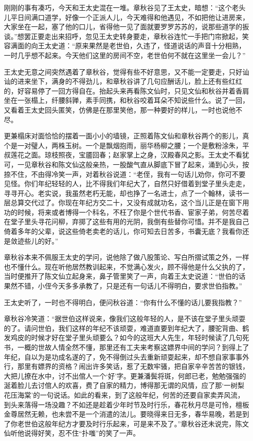 \documentclass[12pt,UTF8]{ctexbook}
\begin{document}
{{{刚刚的事有凑巧，今天和王太史混在一堆。章秋谷见了王太史，暗想：“这个老头儿平日间满口道学，好像一个正派人儿，今天难得和他遇见，不如把他让进房来，大家坐在一起，塞了他的口儿，省得他一见了面就要罗罗苏苏的，说那些道学的扳谈。”想罢正要走出来招呼，忽见王太史转身要走，章秋谷连忙一手把门帘掀起，笑容满面的向王太史道：“原来果然是老世伯，久违了，怪道说话的声音十分相熟，一时几乎想不起来。今天他们这里的房间不空，老世伯何不就在这里坐一会儿？”

王太史无意之间突然遇着了章秋谷，觉得有些不好意思，又不能一定要走，只好讪讪的进来坐下，满身的不得劲儿，和章秋谷讲了几句应酬话儿，脸上还有些红红的，好容易停了一回方得自在。抬起头来再看陈文仙时，只见文仙和秋谷并着香肩坐在一张榻上，纤腰斜亸，素手同携，和秋谷咬着耳朵不知说些什么。说了一回，又看着王太史回头匿笑，仿佛是在那里笑他，那一种要好的样儿，一时也说他不尽。

更兼榻床对面恰恰的摆着一面小小的墙镜，正照着陈文仙和章秋谷两个的影儿，真个是一对璧人，两株玉树。一个是飘烟抱雨，丽华杨柳之腰；一个是敷粉涂朱，平叔莲花之面。琼枝照夜，宝靥回春；赵家掌上之身，汉殿春风之影。王太史不看犹可，一见章秋谷和陈文仙这般亲热，一股酸气直从脚底下冒了起来，涌到心头，按捺不住，不由得冷笑一声，对着秋谷说道：“老侄，我有一句话儿劝你，你可不要见怪。你们年纪轻轻的人，比不得我们年纪大了，自然只好借着到堂子里头走走，寻寻开心。老实说，我虽然老朽无能，却也挣了一名进士，点了一个翰林，读书一层总算交代过了。你现在年纪方交二十，又没有成就功名，这个当儿正是在窗下用功的时候，将来或者博得一个科名，不枉了你是个世代书香、宦家子弟，何苦尽着在堂子里头寻花问柳，弃掷了这些有用的光阴，我倒有些替你可惜。并不是我自己倚着多年的父辈，说这些倚老卖老的话儿，你可知去日苦多，书囊无底？我看你还是敛迹些儿的好。”

章秋谷本来不佩服王太史的学问，说他除了做八股策论、写白所摺试策之外，一样也不懂什么。现在听他居然教训起来，不觉满心发火，顾不得他是什么父执的了，当时便推开了陈文仙立起身来，鼻子管里笑了一声，向着王太史说道：“世伯的话果然不错，小侄今天多多承教了，只是还有一句话儿不得明白，要求世伯指教。”

王太史听了，一时也不得明白，便问秋谷道：“你有什么不懂的话儿要我指教？”

章秋谷冷笑道：“据世伯这样说来，像我们这般年轻的人，是不该在堂子里头顽耍的了。请问世伯，我们这样的年纪不该顽耍，难道直要到年纪大了，腰驼背曲、鹤发鸡皮的时候才好在堂子里头顽要么？如今的这班大人先生，年轻时候读了几句死书，一概的世故人情全然不懂，那里还有工夫来考察这嫖界中间的学问？到得上了年纪，自以为是功成名遂的了，免不得倒过头去重新顽耍起来，却不想自家事事外行，那里有嫖界的资格？闹出许多笑话，惹了无数牢骚，把自家辛辛苦苦的银钱，大把儿撩在水中，讨不出倌人一个‘好’字。更兼潘鬓将斑，何郎已老，勉勉强强的涎着脸儿去讨倌人的欢喜，费了自家的精力，博得那无谓的风情，应了那‘一树梨花压海棠’的一句说话。如此的看来，到了这般年纪，何苦的还要自家卖弄风流，到头来落得一场没趣？不如还是趁着少年时节及时行乐，春花秋月尽是可怜，檀板金尊居然无赖，也未尝不是一个消遣的法儿。要晓得来日无多，春华易晚，若是到了你老世伯这般年纪方才要及时行乐起来，可是来不及了。”章秋谷还未说完，陈文仙听他说得好笑，忍不住“扑嗤”的笑了一声。

}}}
\end{document}
